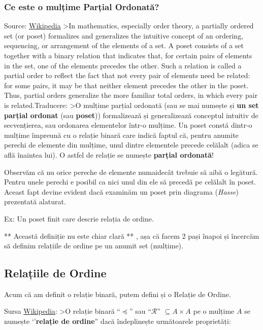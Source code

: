 \documentclass[letterpaper,10pt,english]{/usr/local/lib/python2.7/dist-packages/sphinx/texinputs/sphinxhowto}
\begin{document}
        
    
\subsubsection{Ce este o mulțime Parțial
Ordonată?}\label{ce-este-o-mulux21bime-parux21bial-ordonatux103}Source:
\href{http://en.wikipedia.org/wiki/Partially_ordered_set}{Wikipedia}
\textgreater{}In mathematics, especially order theory, a partially
ordered set (or poset) formalizes and generalizes the intuitive concept
of an ordering, sequencing, or arrangement of the elements of a set. A
poset consists of a set together with a binary relation that indicates
that, for certain pairs of elements in the set, one of the elements
precedes the other. Such a relation is called a partial order to reflect
the fact that not every pair of elements need be related: for some
pairs, it may be that neither element precedes the other in the poset.
Thus, partial orders generalize the more familiar total orders, in which
every pair is related.Traducere: \textgreater{}O mulțime parțial ordonată (sau se mai numește
și \textbf{un set parțial ordonat} (sau \textbf{poset})) formalizează și
generalizează conceptul intuitiv de secvențierea, sau ordonarea
elementelor într-o mulțime. Un poset constă dintr-o mulțime împreună cu
o relație binară care indică faptul că, pentru anumite perechi de
elemente din mulțime, unul dintre elementele precede celălalt (adica se
află înaintea lui). O astfel de relație se numește \textbf{parțial
ordonată}!

Observăm că nu orice pereche de elemente numaidecât trebuie să aibă o
legătură. Pentru unele perechi e posibil ca nici unul din ele să precedă
pe celălalt în poset. Aceast fapt devine evident dacă examinăm un poset
prin diagrama (\emph{Hasse}) prezentată alaturat.

Ex: Un poset finit care descrie relația de ordine.

** Această definiție nu este chiar clară ** , așa că facem 2 pași înapoi
și încercăm să definim relațiile de ordine pe un anumit set (mulțime).\subsection{Relațiile de Ordine}\label{relaux21biile-de-ordine}

Acum că am definit o relație binară, putem defini și o Relație de
Ordine.

Sursa
\href{http://ro.wikipedia.org/wiki/Rela\%C8\%9Bie_de_ordine}{Wikipedia}:
\textgreater{}O relație binară ``$\preceq$'' sau ``$\mathcal{R}$''
$\subseteq A \times A$ pe o mulțime $A$ se numește `'\textbf{relație de
ordine}'' dacă îndeplinește următoarele proprietăți:
\end{document}
